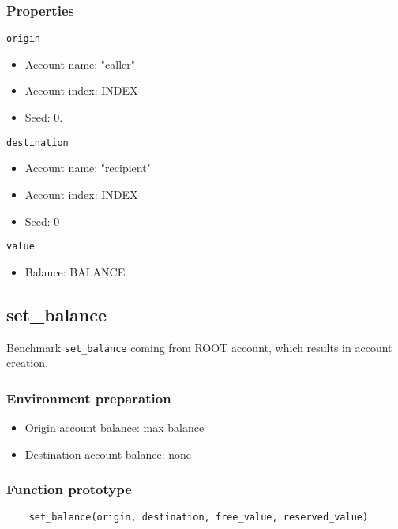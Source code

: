 \documentclass[11pt,a4paper]{article}
\begin{document}
\subsubsection*{Properties}
\verb|origin|
\begin{itemize}
\item Account name: "caller"
\item Account index: INDEX
\item Seed: 0.
\end{itemize}
\verb|destination|
\begin{itemize}
\item Account name: "recipient"
\item Account index: INDEX
\item Seed: 0
\end{itemize}
\verb|value|
\begin{itemize}
\item Balance: BALANCE
\end{itemize}

\subsection{set\_balance}

Benchmark \verb|set_balance| coming from ROOT account, which results in account creation.

\subsubsection*{Environment preparation}
\begin{itemize}
\item Origin account balance: max balance
\item Destination account balance: none
\end{itemize}

\subsubsection*{Function prototype}
\begin{verbatim}
    set_balance(origin, destination, free_value, reserved_value)
\end{verbatim}
\end{document}
